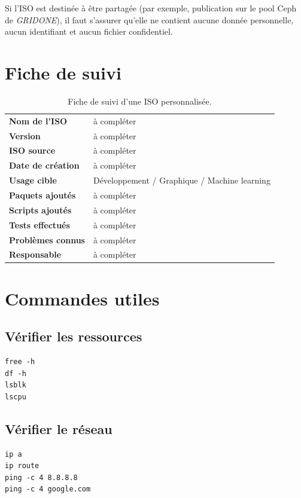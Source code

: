 Si l'ISO est destinée à être partagée (par exemple, publication sur le pool Ceph de \emph{GRIDONE}), il faut s'assurer qu'elle ne contient aucune donnée personnelle, aucun identifiant et aucun fichier confidentiel.

\section{Fiche de suivi}

\begin{table}[H]
\centering
\begin{tabular}{>{\bfseries}p{5cm}p{9cm}}
\toprule
Nom de l'ISO        & à compléter \\
Version             & à compléter \\
ISO source          & à compléter \\
Date de création    & à compléter \\
Usage cible         & Développement / Graphique / Machine learning \\
Paquets ajoutés     & à compléter \\
Scripts ajoutés     & à compléter \\
Tests effectués     & à compléter \\
Problèmes connus    & à compléter \\
Responsable         & à compléter \\
\bottomrule
\end{tabular}
\caption{Fiche de suivi d'une ISO personnalisée.}
\end{table}

\section{Commandes utiles}

\subsection{Vérifier les ressources}

\begin{lstlisting}[basicstyle=\ttfamily\footnotesize, frame=single]
free -h
df -h
lsblk
lscpu
\end{lstlisting}

\subsection{Vérifier le réseau}

\begin{lstlisting}[basicstyle=\ttfamily\footnotesize, frame=single]
ip a
ip route
ping -c 4 8.8.8.8
ping -c 4 google.com
\end{lstlisting}

